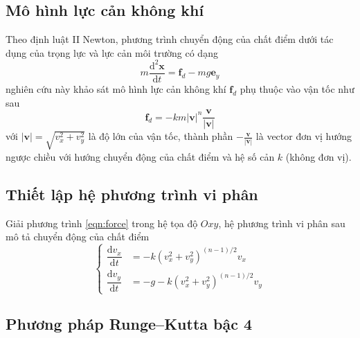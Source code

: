 \subsection{Mô hình lực cản không khí}

Theo định luật II Newton, phương trình chuyển động của chất điểm dưới tác dụng của trọng lực và lực cản môi trường có dạng
\begin{equation}
\label{eqn:force}
m\frac{\mathrm{d}^2\mathbf{x}}{\mathrm{d}t} = \mathbf{f}_d - mg\mathbf{e}_y
\end{equation}
nghiên cứu này khảo sát mô hình lực cản không khí \(\mathbf{f}_d\) phụ thuộc vào vận tốc như sau
\begin{equation}
\mathbf{f}_d = -km |\mathbf{v}|^n \frac{\mathbf{v}}{|\mathbf{v}|}
\end{equation}
với \(|\mathbf{v}| = \sqrt{v_x^2 + v_y^2}\) là độ lớn của vận tốc, thành phần \(-\frac{\mathbf{v}}{|\mathbf{v}|}\) là vector đơn vị hướng ngược chiều với hướng chuyển động của chất điểm và hệ số cản \(k\) (không đơn vị).

\subsection{Thiết lập hệ phương trình vi phân}

Giải phương trình \eqref{eqn:force} trong hệ tọa độ \(Oxy\), hệ phương trình vi phân sau mô tả chuyển động của chất điểm
\begin{equation}
  \label{eqn:soe}
  \begin{cases}
    \dfrac{\mathrm{d}v_x}{\mathrm{d}t} &= -k(v_x^2 + v_y^2)^{(n - 1)/2} v_x \\[1em]
    \dfrac{\mathrm{d}v_y}{\mathrm{d}t} &= -g - k(v_x^2 + v_y^2)^{(n - 1)/2} v_y
  \end{cases}
\end{equation}

\subsection{Phương pháp Runge--Kutta bậc 4}

